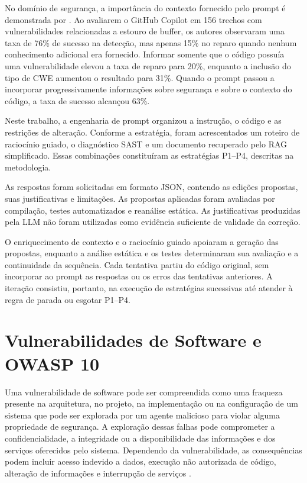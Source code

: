 No domínio de segurança, a importância do contexto fornecido pelo prompt é demonstrada por \cite{khan_code_2025}. Ao avaliarem o GitHub Copilot em 156 trechos com vulnerabilidades relacionadas a estouro de buffer, os autores observaram uma taxa de 76\% de sucesso na detecção, mas apenas 15\% no reparo quando nenhum conhecimento adicional era fornecido. Informar somente que o código possuía uma vulnerabilidade elevou a taxa de reparo para 20\%, enquanto a inclusão do tipo de CWE aumentou o resultado para 31\%. Quando o prompt passou a incorporar progressivamente informações sobre segurança e sobre o contexto do código, a taxa de sucesso alcançou 63\%.

Neste trabalho, a engenharia de prompt organizou a instrução, o código e as restrições de alteração. Conforme a estratégia, foram acrescentados um roteiro de raciocínio guiado, o diagnóstico SAST e um documento recuperado pelo RAG simplificado. Essas combinações constituíram as estratégias P1--P4, descritas na metodologia.

As respostas foram solicitadas em formato JSON, contendo as edições propostas, suas justificativas e limitações. As propostas aplicadas foram avaliadas por compilação, testes automatizados e reanálise estática. As justificativas produzidas pela LLM não foram utilizadas como evidência suficiente de validade da correção.

O enriquecimento de contexto e o raciocínio guiado apoiaram a geração das propostas, enquanto a análise estática e os testes determinaram sua avaliação e a continuidade da sequência. Cada tentativa partiu do código original, sem incorporar ao prompt as respostas ou os erros das tentativas anteriores. A iteração consistiu, portanto, na execução de estratégias sucessivas até atender à regra de parada ou esgotar P1--P4.

\section{Vulnerabilidades de Software e OWASP 10}

Uma vulnerabilidade de software pode ser compreendida como uma fraqueza presente na arquitetura, no projeto, na implementação ou na configuração de um sistema que pode ser explorada por um agente malicioso para violar alguma propriedade de segurança. A exploração dessas falhas pode comprometer a confidencialidade, a integridade ou a disponibilidade das informações e dos serviços oferecidos pelo sistema. Dependendo da vulnerabilidade, as consequências podem incluir acesso indevido a dados, execução não autorizada de código, alteração de informações e interrupção de serviços \cite{calin_software_2020}.

